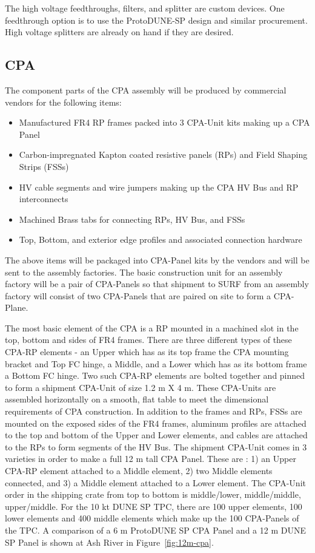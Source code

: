 The high voltage feedthroughs, filters, and splitter are custom devices.  One feedthrough option is to use the ProtoDUNE-SP design and similar procurement.  High voltage splitters are already on hand if they are desired.

\subsection{CPA}
\label{sec:fdsp-hv-prod-cpa}

The component parts of the CPA assembly will be produced by commercial vendors for the following items:
\begin{itemize}
\item Manufactured FR4 RP frames packed into 3 CPA-Unit kits making up a CPA Panel
\item Carbon-impregnated Kapton coated resistive panels (RPs) and Field Shaping Strips (FSSs)
\item HV cable segments and wire jumpers making up the CPA HV Bus and RP interconnects
\item Machined Brass tabs for connecting RPs, HV Bus, and FSSs
\item Top, Bottom, and exterior edge profiles and associated connection hardware
\end{itemize}
The above items will be packaged into CPA-Panel kits by the vendors and will be sent to the assembly factories.  The basic construction unit for an assembly factory will be a pair of CPA-Panels so that shipment to SURF from an assembly factory will consist of two CPA-Panels that are paired on site to form a CPA-Plane.

The most basic element of the CPA is a RP mounted in a machined slot in the top, bottom and sides of FR4 frames.  There are three different types of these CPA-RP elements - an Upper which has as its top frame the CPA mounting bracket and Top FC hinge, a Middle, and a Lower which has as its bottom frame a Bottom FC hinge.  Two such CPA-RP elements are bolted together and pinned to form a shipment CPA-Unit of size 1.2 m X 4 m.  These CPA-Units are assembled horizontally on a smooth, flat table to meet the dimensional requirements of CPA construction.  In addition to the frames and RPs, FSSs are mounted on the exposed sides of the FR4 frames, aluminum profiles are attached to the top and bottom of the Upper and Lower elements, and cables are attached to the RPs to form segments of the HV Bus.  The shipment CPA-Unit comes in 3 varieties in order to make a full 12 m tall CPA Panel.  These are : 1) an Upper CPA-RP element attached to a Middle element, 2) two Middle elements connected, and 3) a Middle element attached to a Lower element.  The CPA-Unit order in the shipping crate from top to bottom is middle/lower, middle/middle, upper/middle.  For the 10 kt DUNE SP TPC, there are 100 upper elements, 100 lower elements and 400 middle elements which make up the 100 CPA-Panels of the TPC.
A comparison of a 6 m ProtoDUNE SP CPA Panel and a 12 m DUNE SP Panel is shown at Ash River in Figure~\ref{fig:12m-cpa}.

